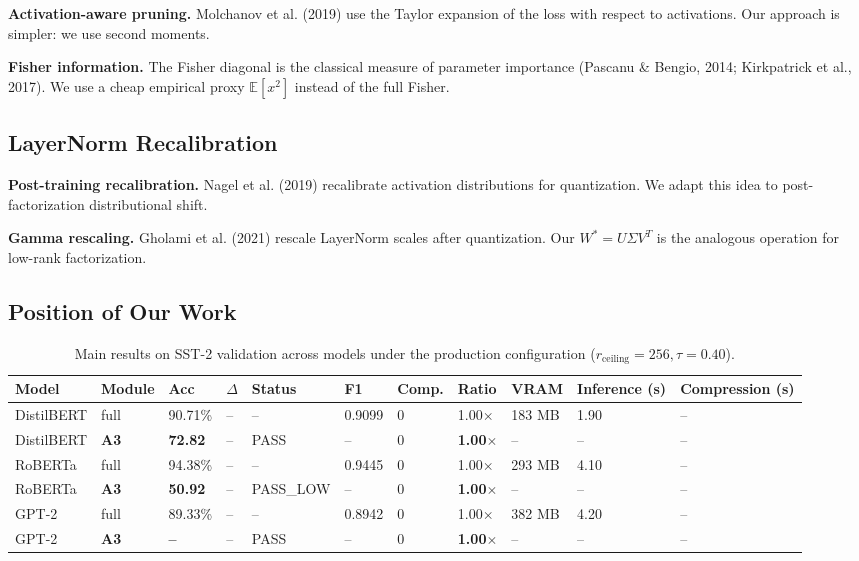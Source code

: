 \textbf{Activation-aware pruning.} Molchanov et al. (2019) use the Taylor expansion 
of the loss with respect to activations. Our approach is simpler: we use 
second moments.

\textbf{Fisher information.} The Fisher diagonal is the classical measure of 
parameter importance (Pascanu \& Bengio, 2014; Kirkpatrick et al., 2017). We 
use a cheap empirical proxy $\mathbb{E}[x^2]$ instead of the full Fisher.

\subsection{LayerNorm Recalibration}

\textbf{Post-training recalibration.} Nagel et al. (2019) recalibrate activation 
distributions for quantization. We adapt this idea to post-factorization 
distributional shift.

\textbf{Gamma rescaling.} Gholami et al. (2021) rescale LayerNorm scales after 
quantization. Our $W^* = U \Sigma V^T$ is the analogous operation 
for low-rank factorization.

\subsection{Position of Our Work}

\begin{table}[t]
\centering
\small
\begin{tabular}{lllllllllll}
\toprule
\textbf{Model} & \textbf{Module} & \textbf{Acc} & \textbf{$\Delta$} & \textbf{Status} & \textbf{F1} & \textbf{Comp.} & \textbf{Ratio} & \textbf{VRAM} & \textbf{Inference (s)} & \textbf{Compression (s)} \\
\midrule
DistilBERT & full & 90.71\% & -- & -- & 0.9099 & 0 & 1.00$\times$ & 183 MB & 1.90 & -- \\
DistilBERT & \textbf{A3} & \textbf{72.82} & -- & PASS & -- & 0 & \textbf{1.00$\times$} & -- & -- & -- \\
RoBERTa & full & 94.38\% & -- & -- & 0.9445 & 0 & 1.00$\times$ & 293 MB & 4.10 & -- \\
RoBERTa & \textbf{A3} & \textbf{50.92} & -- & PASS_LOW & -- & 0 & \textbf{1.00$\times$} & -- & -- & -- \\
GPT-2 & full & 89.33\% & -- & -- & 0.8942 & 0 & 1.00$\times$ & 382 MB & 4.20 & -- \\
GPT-2 & \textbf{A3} & \textbf{--} & -- & PASS & -- & 0 & \textbf{1.00$\times$} & -- & -- & -- \\
\bottomrule
\end{tabular}
\caption{Main results on SST-2 validation across models under the production configuration ($r_{\mathrm{ceiling}}=256, \tau=0.40$).}
\label{tab:main_sst2}
\end{table}

